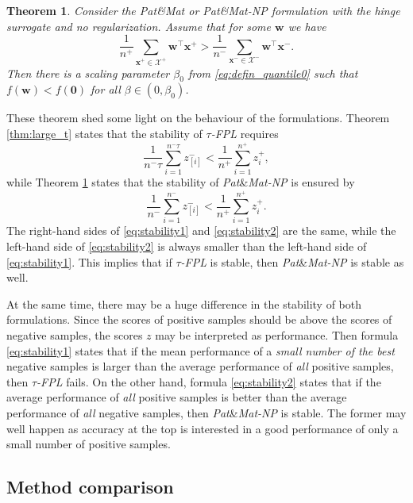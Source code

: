 \documentclass[]{interact}
\theoremstyle{plain}%
\newtheorem{theorem}{Theorem}[section]
\theoremstyle{definition}
\theoremstyle{remark}
\newcommand{\patmat}{\emph{Pat}\&\emph{Mat}\xspace}
\newcommand{\npB}{{\emph{Pat}\&\emph{Mat-NP}}\xspace}
\newcommand{\npC}{{\emph{$\tau$-FPL}}\xspace}
\newcommand{\Xcal}{\mathcal{X}}
\begin{document}
\begin{theorem}\label{thm:patmat_zero}
Consider the \patmat or \npB formulation with the hinge surrogate and no regularization. Assume that for some $\bm w$ we have
\begin{equation}\label{eq:patmat_zero}
\frac{1}{n^+}\sum_{\bm x^+\in \Xcal^+}\bm w^\top \bm x^+ > \frac{1}{n^-}\sum_{\bm x^-\in \Xcal^-}\bm w^\top \bm x^-.
\end{equation}
Then there is a scaling parameter $\beta_0$ from \eqref{eq:defin_quantile0} such that $f(\bm w)<f(\bm 0)$ for all $\beta\in(0,\beta_0)$.
\end{theorem}

These theorem shed some light on the behaviour of the formulations. Theorem \ref{thm:large_t} states that the stability of \npC requires
\begin{equation}\label{eq:stability1}
  \frac{1}{n^-\tau}\sum_{i=1}^{n^-\tau}z_{[i]}^- < \frac{1}{n^+}\sum_{i=1}^{n^+} z_{i}^+,
\end{equation}
while Theorem \ref{thm:patmat_zero} states that the stability of \npB is ensured by
\begin{equation}\label{eq:stability2}
  \frac{1}{n^-}\sum_{i=1}^{n^-}z_{[i]}^- < \frac{1}{n^+}\sum_{i=1}^{n^+} z_{i}^+.
\end{equation}
The right-hand sides of \eqref{eq:stability1} and \eqref{eq:stability2} are the same, while the left-hand side of \eqref{eq:stability2} is always smaller than the left-hand side of \eqref{eq:stability1}. This implies that if \npC is stable, then \npB is stable as well.

At the same time, there may be a huge difference in the stability of both formulations. Since the scores of positive samples should be above the scores of negative samples, the scores $z$ may be interpreted as performance. Then formula \eqref{eq:stability1} states that if the mean performance of a \emph{small number of the best} negative samples is larger than the average performance of \emph{all} positive samples, then \npC fails. On the other hand, formula \eqref{eq:stability2} states that if the average performance of \emph{all} positive samples is better than the average performance of \emph{all} negative samples, then \npB is stable. The former may well happen as accuracy at the top is interested in a good performance of only a small number of positive samples. %


\subsection{Method comparison}
\end{document}
